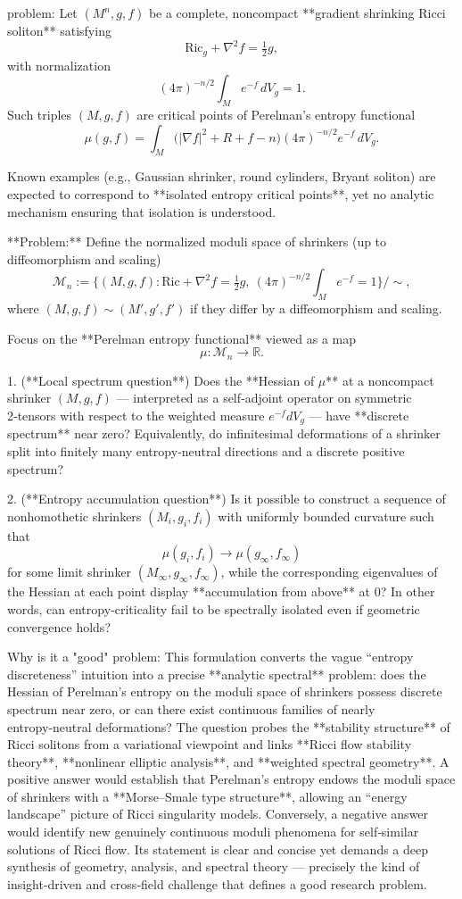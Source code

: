 problem:  
Let \((M^n,g,f)\) be a complete, noncompact **gradient shrinking Ricci soliton** satisfying  
\[
\mathrm{Ric}_g + \nabla^2 f = \tfrac{1}{2} g,
\]
with normalization  
\[
(4\pi)^{-n/2}\int_M e^{-f}\,dV_g = 1.
\]  
Such triples \((M,g,f)\) are critical points of Perelman’s entropy functional  
\[
\mu(g,f) = \int_M \big(|\nabla f|^2 + R + f - n\big) (4\pi)^{-n/2} e^{-f}\,dV_g.
\]

Known examples (e.g., Gaussian shrinker, round cylinders, Bryant soliton) are expected to correspond to **isolated entropy critical points**, yet no analytic mechanism ensuring that isolation is understood.

**Problem:**  
Define the normalized moduli space of shrinkers (up to diffeomorphism and scaling)
\[
\mathcal{M}_n := \{(M,g,f): \mathrm{Ric}+\nabla^2 f=\tfrac12 g,\ (4\pi)^{-n/2}\int_M e^{-f}=1\}/\!\!\sim ,
\]
where \((M,g,f)\sim (M',g',f')\) if they differ by a diffeomorphism and scaling.

Focus on the **Perelman entropy functional** viewed as a map  
\[
\mu : \mathcal{M}_n \to \mathbb{R}.
\]

1. (**Local spectrum question**)  
Does the **Hessian of \(\mu\)** at a noncompact shrinker \((M,g,f)\) — interpreted as a self‑adjoint operator on symmetric 2‑tensors with respect to the weighted measure \(e^{-f}dV_g\) — have **discrete spectrum** near zero?  
Equivalently, do infinitesimal deformations of a shrinker split into finitely many entropy‑neutral directions and a discrete positive spectrum?

2. (**Entropy accumulation question**)  
Is it possible to construct a sequence of nonhomothetic shrinkers \((M_i,g_i,f_i)\) with uniformly bounded curvature such that  
\[
\mu(g_i,f_i)\to \mu(g_\infty,f_\infty)
\]
for some limit shrinker \((M_\infty,g_\infty,f_\infty)\),
while the corresponding eigenvalues of the Hessian at each point display **accumulation from above** at \(0\)?  
In other words, can entropy‑criticality fail to be spectrally isolated even if geometric convergence holds?

Why is it a "good" problem:  
This formulation converts the vague “entropy discreteness” intuition into a precise **analytic spectral** problem: does the Hessian of Perelman’s entropy on the moduli space of shrinkers possess discrete spectrum near zero, or can there exist continuous families of nearly entropy‑neutral deformations?  
The question probes the **stability structure** of Ricci solitons from a variational viewpoint and links **Ricci flow stability theory**, **nonlinear elliptic analysis**, and **weighted spectral geometry**.  
A positive answer would establish that Perelman’s entropy endows the moduli space of shrinkers with a **Morse–Smale type structure**, allowing an “energy landscape” picture of Ricci singularity models.  
Conversely, a negative answer would identify new genuinely continuous moduli phenomena for self‑similar solutions of Ricci flow.  
Its statement is clear and concise yet demands a deep synthesis of geometry, analysis, and spectral theory — precisely the kind of insight-driven and cross‑field challenge that defines a good research problem.
